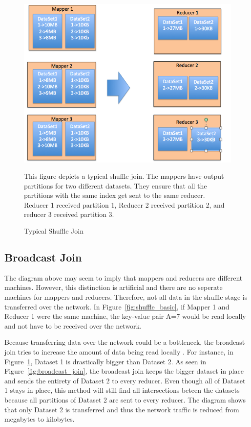 \begin{figure}[h]
\begin{center}
\includegraphics[scale=0.6]{./img/shuffle_join.png}
\caption{Typical Shuffle Join}
\label{fig:shuffle_join}
\end{center}
This figure depicts a typical shuffle join. The mappers have output partitions for two different datasets.
They ensure that all the partitions with the same index get sent to the same reducer. Reducer 1 received partition 1,
Reducer 2 received partition 2, and reducer 3 received partition 3.
\end{figure}

\subsection {Broadcast Join}
The diagram above  may seem to imply that mappers and reducers
are different machines. However, this distinction is artificial and there are no seperate machines for mappers and reducers. 
Therefore, not all data in the shuffle stage is transferred over the network. In Figure~\ref{fig:shuffle_basic}, if Mapper 1
and Reducer 1 were the same machine, the key-value pair A=7 would be read locally and not have to be received over the network.

Because transferring data over the network could be a bottleneck, the broadcast join tries to increase the amount of data 
being read locally \cite{sparkanalysis}. For instance, in Figure~\ref{fig:shuffle_join}, Dataset 1 is drastically bigger than Dataset 2. As seen in Figure~\ref{fig:broadcast_join},
the broadcast join keeps the bigger dataset in place and sends the entirety of Dataset 2 to every reducer. Even though all of Dataset 1 stays in place, this method will still find all intersections beteen the datasets  because all partitions of Dataset 2 are sent to every reducer. The diagram shows that only Dataset 2 is transferred and thus the  network traffic is reduced from megabytes to kilobytes.

